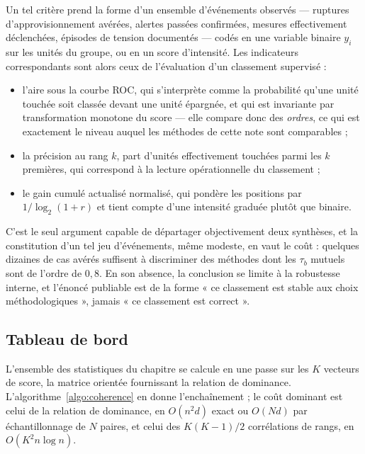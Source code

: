 \documentclass[11pt,a4paper]{article}
\theoremstyle{definition}
\theoremstyle{remark}
\begin{document}
\medskip

Un tel critère prend la forme d'un ensemble d'événements observés --- ruptures
d'approvisionnement avérées, alertes passées confirmées, mesures effectivement déclenchées,
épisodes de tension documentés --- codés en une variable binaire $y_i$ sur les unités du
groupe, ou en un score d'intensité. Les indicateurs correspondants sont alors ceux de
l'évaluation d'un classement supervisé :

\medskip

\begin{itemize}[nosep,leftmargin=1.4em]
  \item l'aire sous la courbe ROC, qui s'interprète comme la probabilité qu'une unité
  touchée soit classée devant une unité épargnée, et qui est invariante par transformation
  monotone du score --- elle compare donc des \emph{ordres}, ce qui est exactement le niveau
  auquel les méthodes de cette note sont comparables ;
  \item la précision au rang $k$, part d'unités effectivement touchées parmi les $k$
  premières, qui correspond à la lecture opérationnelle du classement ;
  \item le gain cumulé actualisé normalisé, qui pondère les positions par $1/\log_2(1+r)$ et
  tient compte d'une intensité graduée plutôt que binaire.
\end{itemize}

\bigskip

C'est le seul argument capable de départager objectivement deux synthèses, et la
constitution d'un tel jeu d'événements, même modeste, en vaut le coût : quelques dizaines de
cas avérés suffisent à discriminer des méthodes dont les $\tau_b$ mutuels sont de l'ordre de
$0{,}8$. En son absence, la conclusion se limite à la robustesse interne, et l'énoncé
publiable est de la forme « ce classement est stable aux choix méthodologiques », jamais
« ce classement est correct ».

\bigskip

\subsection{Tableau de bord}
\label{sec:tableau-bord}

\medskip

L'ensemble des statistiques du chapitre se calcule en une passe sur les $K$ vecteurs de
score, la matrice orientée fournissant la relation de dominance.
L'algorithme~\ref{algo:coherence} en donne l'enchaînement ; le coût dominant est celui de la
relation de dominance, en $O(n^2 d)$ exact ou $O(N d)$ par échantillonnage de $N$ paires, et
celui des $K(K-1)/2$ corrélations de rangs, en $O(K^2 n\log n)$.
\end{document}
